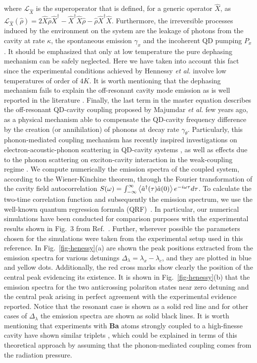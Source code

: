 \documentclass[aps,prl,showpacs,twocolumn]{revtex4}
\newcommand{\meanv}[1]{\left< #1 \vphantom{#1} \right>} %
\begin{document}
where $\mathcal{L}_{\hat{X}}$ is the superoperator that is defined, for a generic operator $\hat{X}$, as $\mathcal{L}_{\hat{X}}(\hat{\rho})=2\hat{X}\hat{\rho}\hat{X}^{\dagger}-\hat{X}^{\dagger}\hat{X}\hat{\rho}-\hat{\rho}\hat{X}^{\dagger}\hat{X}$. Furthermore, the irreversible processes induced by the environment on the system are the leakage of photons from the cavity at rate $\kappa$, the spontaneous emission $\gamma_x$ and the incoherent QD pumping $P_x$. It should be emphasized that only at low temperature the pure dephasing mechanism can be safely neglected. Here we have taken into account this fact since the experimental conditions achieved by Hennessy {\it et al.} involve low temperatures of order of $4K$. It is worth mentioning that the dephasing mechanism fails to explain the off-resonant cavity mode emission as is well reported in the literature \cite{Hughes:2009,Yamaguchi:2008,Suffczyński:2009}. Finally, the last term in the master equation describes the off-resonant QD-cavity coupling proposed by Majumdar {\it et al.} \cite{Majumdar:2010} few years ago, as a physical mechanism able to compensate the QD-cavity frequency difference by the creation (or annihilation) of phonons at decay rate $\gamma_\theta$. Particularly, this phonon-mediated coupling mechanism has recently inspired investigations on electron-acoustic-phonon scattering in QD-cavity systems \cite{Roy:2011}, as well as effects due to the phonon scattering on exciton-cavity interaction in the weak-coupling regime \cite{Jarlov:2016}. We compute numerically the emission spectra of the coupled system, according to the Wiener-Kinchine theorem, through the Fourier transformation of the cavity field autocorrelation  $S(\omega)=\int_{-\infty}^{\infty}\meanv{\hat{a}^{\dagger}(\tau)\hat{a}(0)}e^{-i\omega \tau}d\tau$. 
To calculate the two-time correlation function and subsequently the emission spectrum, we use the well-known quantum regression formula (QRF)~\cite{Perea:2004}. In particular, our numerical simulations have been conducted for comparison purposes with the experimental results shown in Fig.~$3$ from Ref.~\cite{Hennessy:2007}. Further, wherever possible the parameters chosen for the simulations were taken from the experimental setup used in this reference. In Fig.~\ref{fig-henessy}(a) are shown the peak positions extracted from the emission spectra for various detunings $\Delta_{\lambda}=\lambda_x-\lambda_c$, and they are plotted in blue and yellow dots. Additionally, the red cross marks show clearly the position of the central peak evidencing its existence. It is shown in Fig.~\ref{fig-henessy}(b) that the emission spectra for the two anticrossing polariton states near zero detuning and the central peak arising in perfect agreement with the experimental evidence reported. Notice that the resonant case is shown as a solid red line and for other cases of $\Delta_{\lambda}$ the emission spectra are shown as solid black lines. It is worth mentioning that experiments with \textbf{Ba} atoms strongly coupled to a high-finesse cavity have shown similar triplets \cite{Childs:1996}, which could be explained in terms of this theoretical approach by assuming that the phonon-mediated coupling comes from the radiation pressure.
\end{document}

